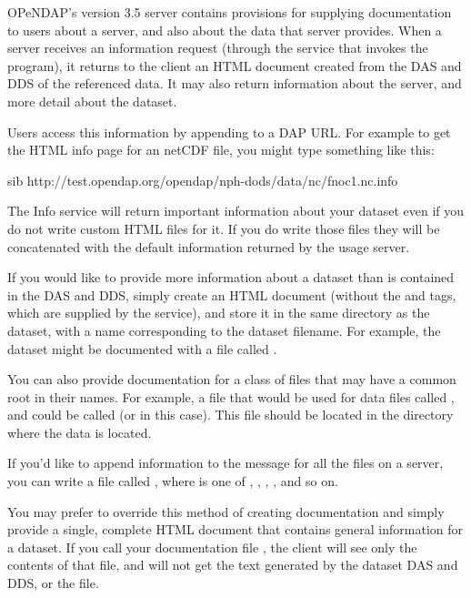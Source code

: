 \documentclass{dods-book}
\begin{document}
 OPeNDAP's version 3.5 server
contains provisions for supplying documentation to users about a
server, and also about the data that server provides. When a server
receives an information request (through the  service that
invokes the  program), it returns to the client an HTML
document created from the DAS and DDS of the referenced data. It may
also return information about the server, and more detail about the
dataset. 

Users access this information by appending  to a DAP URL.
For example to get the HTML info page for an netCDF file, you might
type something like this:

\begin{vcode}{sib}
http://test.opendap.org/opendap/nph-dods/data/nc/fnoc1.nc.info
\end{vcode}

The Info service will return important information about your dataset
even if you do not write custom HTML files for it. If you do write
those files they will be concatenated with the default information
returned by the usage server.

If you would like to provide more information about a dataset than is
contained in the DAS and DDS, simply create an HTML document (without
the  and  tags, which are supplied by the
 service), and store it in the same directory as the
dataset, with a name corresponding to the dataset filename.  For
example, the dataset  might be documented with a file
called .

You can also provide documentation for a class of files that may have
a common root in their names.  For example, a file that would be used
for data files called ,  and
 could be called  (or  in
this case). This file should be located in the directory where the
data is located.

If you'd like to append information to the  message for all
the files on a server, you can write a file called
, where  is one of
, , , , and so on.

You may prefer to override this method of creating documentation and
simply provide a single, complete HTML document that contains general
information for a dataset.  If you call your documentation file
, the client will see only the contents of that file,
and will not get the text generated by the dataset DAS and DDS, or the
 file.
\end{document}
